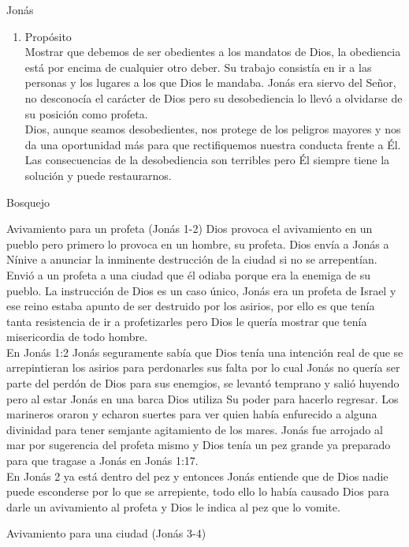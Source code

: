 \begin{section}{Jonás}
\begin{enumerate}
		\item Propósito\\
			Mostrar que debemos de ser obedientes a los mandatos de Dios, la obediencia está por encima de cualquier otro deber. Su trabajo consistía en ir a las personas y los lugares a los que Dios le mandaba. Jonás era siervo del Señor, no desconocía el carácter de Dios pero su desobediencia lo llevó a olvidarse de su posición como profeta.\\
			Dios, aunque seamos desobedientes, nos protege de los peligros mayores y nos da una oportunidad más para que rectifiquemos nuestra conducta frente a Él. Las consecuencias de la desobediencia son terribles pero Él siempre tiene la solución y puede restaurarnos.
	\end{enumerate}
	\newpage
	\begin{subsection}{Bosquejo}
		\begin{subsubsection}{Avivamiento para un profeta (Jonás 1-2)}
			Dios provoca el avivamiento en un pueblo pero primero lo provoca en un hombre, su profeta. Dios envía a Jonás a Nínive a anunciar la inminente destrucción de la ciudad si no se arrepentían. Envió a un profeta a una ciudad que él odiaba porque era la enemiga de su pueblo. La instrucción de Dios es un caso único, Jonás era un profeta de Israel y ese reino estaba apunto de ser destruido por los asirios, por ello es que tenía tanta resistencia de ir a profetizarles pero Dios le quería mostrar que tenía misericordia de todo hombre.\\
			En Jonás 1:2 Jonás seguramente sabía que Dios tenía una intención real de que se arrepintieran los asirios para perdonarles sus falta por lo cual Jonás no quería ser parte del perdón de Dios para sus enemgios, se levantó temprano y salió huyendo pero al estar Jonás en una barca Dios utiliza Su poder para hacerlo regresar. Los marineros oraron y echaron suertes para ver quien había enfurecido a alguna divinidad para tener semjante agitamiento de los mares. Jonás fue arrojado al mar por sugerencia del profeta mismo y Dios tenía un pez grande ya preparado para que tragase a Jonás en Jonás 1:17.\\
			En Jonás 2 ya está dentro del pez y entonces Jonás entiende que de Dios nadie puede esconderse por lo que se arrepiente, todo ello lo había causado Dios para darle un avivamiento al profeta y Dios le indica al pez que lo vomite.
		\end{subsubsection}
		\begin{subsubsection}{Avivamiento para una ciudad (Jonás 3-4)}

\end{subsubsection}
\end{subsection}
\end{section}
